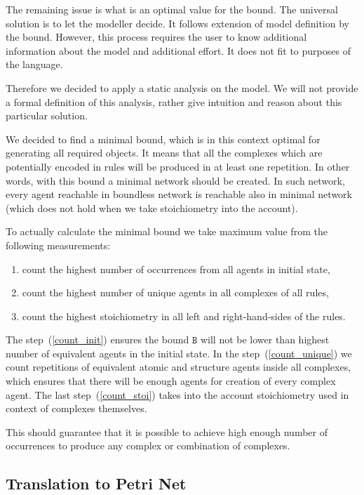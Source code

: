 \documentclass[12pt]{fithesis2}
\begin{document}
The remaining issue is what is an optimal value for the bound. The universal solution is to let the modeller decide. It follows extension of model definition by the bound. However, this process requires the user to know additional information about the model and additional effort. It does not fit to purposes of the language.

Therefore we decided to apply a static analysis on the model. We will not provide a formal definition of this analysis, rather give intuition and reason about this particular solution.

We decided to find a minimal bound, which is in this context optimal for generating all required objects. It means that all the complexes which are potentially encoded in rules  will be produced in at least one repetition. In other words, with this bound a minimal network should be created. In such network, every agent reachable in boundless network is reachable also in minimal network (which does not hold when we take stoichiometry into the account).

To actually calculate the minimal bound we take maximum value from the following measurements:

\begin{enumerate}
  \item \label{count_init} count the highest number of occurrences from all agents in initial state,
  \item \label{count_unique} count the highest number of unique agents in all complexes of all rules,
  \item \label{count_stoi} count the highest stoichiometry in all left and right-hand-sides of the rules.
\end{enumerate}

The step~(\ref{count_init}) ensures the bound $\mathtt{B}$ will not be lower than highest number of equivalent agents in the initial state. In the step~(\ref{count_unique}) we count repetitions of equivalent atomic and structure agents inside all complexes, which ensures that there will be enough agents for creation of every complex agent. The last step~(\ref{count_stoi}) takes into the account stoichiometry used in context of complexes themselves.

This should guarantee that it is possible to achieve high enough number of occurrences to produce any complex or combination of complexes.

\subsection{Translation to Petri Net}
\end{document}
